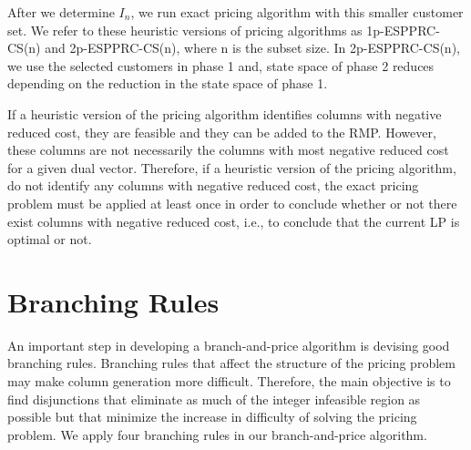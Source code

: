 After we determine $I_n$, we run exact pricing algorithm with this smaller customer
set. We refer to these heuristic versions 
of pricing algorithms as 1p-ESPPRC-CS(n) and 2p-ESPPRC-CS(n), where n is the subset size. 
In 2p-ESPPRC-CS(n), we use the selected customers in phase 1 and, state space of phase 
2 reduces depending on the reduction in the state space of phase 1.  


 

If a heuristic version of the pricing algorithm identifies columns with negative 
reduced cost, they are feasible and they can be added to the RMP. 
However, these columns are not necessarily the columns with most negative
reduced cost for a given dual vector. Therefore, if a heuristic version of the pricing algorithm, 
do not identify any columns with negative reduced cost, the exact pricing problem
must be applied at least once in order to conclude whether or not there exist columns 
with negative reduced cost, i.e., to conclude that the current LP is optimal or not. 

\section{Branching Rules}
\label{branchingRule}

An important step in developing a branch-and-price algorithm is devising good branching rules.
Branching rules that affect the structure of the pricing problem may make column generation more
difficult. Therefore, the main objective is to find disjunctions that eliminate as much of the integer
infeasible region as possible but that minimize the increase in difficulty of solving the pricing
problem. We apply four branching rules in our branch-and-price algorithm.

